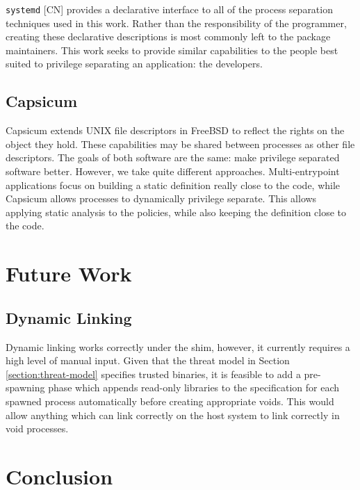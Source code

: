 \documentclass[sigplan]{acmart}
\begin{document}
\texttt{systemd} [CN] provides a declarative interface to all of the process separation techniques used in this work. Rather than the responsibility of the programmer, creating these declarative descriptions is most commonly left to the package maintainers. This work seeks to provide similar capabilities to the people best suited to privilege separating an application: the developers.

\subsection{Capsicum}

Capsicum \citep{watson_capsicum_2010} extends UNIX file descriptors in FreeBSD to reflect the rights on the object they hold. These capabilities may be shared between processes as other file descriptors. The goals of both software are the same: make privilege separated software better. However, we take quite different approaches. Multi-entrypoint applications focus on building a static definition really close to the code, while Capsicum allows processes to dynamically privilege separate. This allows applying static analysis to the policies, while also keeping the definition close to the code.


\section{Future Work}

\subsection{Dynamic Linking}

Dynamic linking works correctly under the shim, however, it currently requires a high level of manual input. Given that the threat model in Section \ref{section:threat-model} specifies trusted binaries, it is feasible to add a pre-spawning phase which appends read-only libraries to the specification for each spawned process automatically before creating appropriate voids. This would allow anything which can link correctly on the host system to link correctly in void processes.


\section{Conclusion}


\begin{acks}
\end{acks}




\appendix
\end{document}
